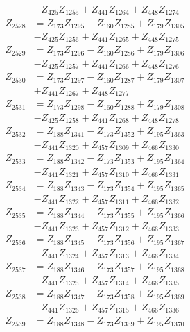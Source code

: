 \begin{multicols}{2}
\begin{align}
&- Z_{425}Z_{1255} + Z_{441}Z_{1264} + Z_{448}Z_{1274} \nonumber \\
Z_{2528} &= Z_{173}Z_{1295} - Z_{160}Z_{1285} + Z_{179}Z_{1305}  \nonumber \\
&- Z_{425}Z_{1256} + Z_{441}Z_{1265} + Z_{448}Z_{1275} \nonumber \\
Z_{2529} &= Z_{173}Z_{1296} - Z_{160}Z_{1286} + Z_{179}Z_{1306}  \nonumber \\
&- Z_{425}Z_{1257} + Z_{441}Z_{1266} + Z_{448}Z_{1276} \nonumber \\
Z_{2530} &= Z_{173}Z_{1297} - Z_{160}Z_{1287} + Z_{179}Z_{1307}  \nonumber \\
&+ Z_{441}Z_{1267} + Z_{448}Z_{1277} \nonumber \\
Z_{2531} &= Z_{173}Z_{1298} - Z_{160}Z_{1288} + Z_{179}Z_{1308}  \nonumber \\
&- Z_{425}Z_{1258} + Z_{441}Z_{1268} + Z_{448}Z_{1278} \nonumber \\
Z_{2532} &= Z_{188}Z_{1341} - Z_{173}Z_{1352} + Z_{195}Z_{1363}  \nonumber \\
&- Z_{441}Z_{1320} + Z_{457}Z_{1309} + Z_{466}Z_{1330} \nonumber \\
Z_{2533} &= Z_{188}Z_{1342} - Z_{173}Z_{1353} + Z_{195}Z_{1364}  \nonumber \\
&- Z_{441}Z_{1321} + Z_{457}Z_{1310} + Z_{466}Z_{1331} \nonumber \\
Z_{2534} &= Z_{188}Z_{1343} - Z_{173}Z_{1354} + Z_{195}Z_{1365}  \nonumber \\
&- Z_{441}Z_{1322} + Z_{457}Z_{1311} + Z_{466}Z_{1332} \nonumber \\
Z_{2535} &= Z_{188}Z_{1344} - Z_{173}Z_{1355} + Z_{195}Z_{1366}  \nonumber \\
&- Z_{441}Z_{1323} + Z_{457}Z_{1312} + Z_{466}Z_{1333} \nonumber \\
Z_{2536} &= Z_{188}Z_{1345} - Z_{173}Z_{1356} + Z_{195}Z_{1367}  \nonumber \\
&- Z_{441}Z_{1324} + Z_{457}Z_{1313} + Z_{466}Z_{1334} \nonumber \\
Z_{2537} &= Z_{188}Z_{1346} - Z_{173}Z_{1357} + Z_{195}Z_{1368}  \nonumber \\
&- Z_{441}Z_{1325} + Z_{457}Z_{1314} + Z_{466}Z_{1335} \nonumber \\
Z_{2538} &= Z_{188}Z_{1347} - Z_{173}Z_{1358} + Z_{195}Z_{1369}  \nonumber \\
&- Z_{441}Z_{1326} + Z_{457}Z_{1315} + Z_{466}Z_{1336} \nonumber \\
Z_{2539} &= Z_{188}Z_{1348} - Z_{173}Z_{1359} + Z_{195}Z_{1370}  \nonumber \\

\end{align}
\end{multicols}
